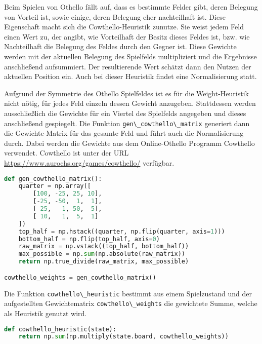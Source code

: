 Beim Spielen von Othello fällt auf, dass es bestimmte Felder gibt, deren
Belegung von Vorteil ist, sowie einige, deren Belegung eher nachteilhaft
ist. Diese Eigenschaft macht sich die Cowthello-Heuristik
\cite{cowthello} zunutze. Sie weist jedem Feld einen Wert zu, der
angibt, wie Vorteilhaft der Besitz dieses Feldes ist, bzw. wie
Nachteilhaft die Belegung des Feldes durch den Gegner ist. Diese
Gewichte werden mit der aktuellen Belegung des Spielfelds multipliziert
und die Ergebnisse anschließend aufsummiert. Der resultierende Wert
schätzt dann den Nutzen der aktuellen Position ein. Auch bei dieser
Heuristik findet eine Normalisierung statt.

Aufgrund der Symmetrie des Othello Spielfeldes ist es für die
Weight-Heuristik nicht nötig, für jedes Feld einzeln dessen Gewicht
anzugeben. Stattdessen werden ausschließlich die Gewichte für ein
Viertel des Spielfelds angegeben und dieses anschließend gespiegelt. Die
Funktion \passthrough{\lstinline!gen\_cowthello\_matrix!} generiert dann
die Gewichte-Matrix für das gesamte Feld und führt auch die
Normalisierung durch. Dabei werden die Gewichte aus dem Online-Othello
Programm Cowthello \cite{cowthello} verwendet. Cowthello ist unter der
URL \url{https://www.aurochs.org/games/cowthello/} verfügbar.

\begin{lstlisting}[language=Python]
def gen_cowthello_matrix():
    quarter = np.array([
        [100, -25, 25, 10],
        [-25, -50,  1,  1],
        [ 25,   1, 50,  5],
        [ 10,   1,  5,  1]
    ])
    top_half = np.hstack((quarter, np.flip(quarter, axis=1)))
    bottom_half = np.flip(top_half, axis=0)
    raw_matrix = np.vstack((top_half, bottom_half))
    max_possible = np.sum(np.absolute(raw_matrix))
    return np.true_divide(raw_matrix, max_possible)

cowthello_weights = gen_cowthello_matrix()
\end{lstlisting}

Die Funktion \passthrough{\lstinline!cowthello\_heuristic!} bestimmt aus
einem Spielzustand und der aufgestellten Gewichtematrix
\passthrough{\lstinline!cowthello\_weights!} die gewichtete Summe,
welche als Heuristik genutzt wird.

\begin{lstlisting}[language=Python]
def cowthello_heuristic(state):
    return np.sum(np.multiply(state.board, cowthello_weights))
\end{lstlisting}

